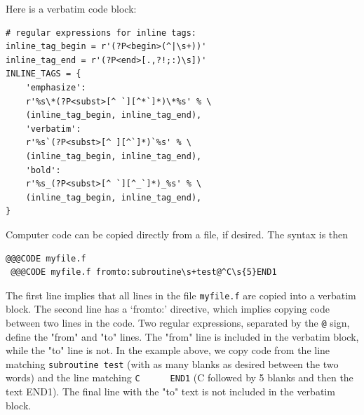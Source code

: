 \documentclass{article}
\begin{document}
Here is a verbatim code block:
\providecommand{\shadedskip}{}
\renewenvironment{shadedskip}{
\def\FrameCommand{\colorbox{shadecolor}}\FrameRule0.6pt
\MakeFramed {\FrameRestore}\vskip3mm}{\vskip0mm\endMakeFramed}
\providecommand{\shadedquoteBlue}{}
\renewenvironment{shadedquoteBlue}[1][]{
\bgroup\rmfamily
\fboxsep=0mm\relax
\begin{shadedskip}
\list{}{\parsep=-2mm\parskip=0mm\topsep=0pt\leftmargin=2mm
\rightmargin=2\leftmargin\leftmargin=4pt\relax}
\item\relax}
{\endlist\end{shadedskip}\egroup}\begin{shadedquoteBlue}
\fontsize{9pt}{9pt}
\begin{Verbatim}
# regular expressions for inline tags:
inline_tag_begin = r'(?P<begin>(^|\s+))'
inline_tag_end = r'(?P<end>[.,?!;:)\s])'
INLINE_TAGS = {
    'emphasize':
    r'%s\*(?P<subst>[^ `][^*`]*)\*%s' % \
    (inline_tag_begin, inline_tag_end),
    'verbatim':
    r'%s`(?P<subst>[^ ][^`]*)`%s' % \
    (inline_tag_begin, inline_tag_end),
    'bold':
    r'%s_(?P<subst>[^ `][^_`]*)_%s' % \
    (inline_tag_begin, inline_tag_end),
}
\end{Verbatim}
\end{shadedquoteBlue}
\noindent

Computer code can be copied directly from a file, if desired. The syntax
is then
\begin{Verbatim}[fontsize=\fontsize{9pt}{9pt},tabsize=8,baselinestretch=0.85,
fontfamily=tt,xleftmargin=7mm]
 @@@CODE myfile.f
 @@@CODE myfile.f fromto:subroutine\s+test@^C\s{5}END1
\end{Verbatim}
\noindent
The first line implies that all lines in the file {\fontsize{10pt}{10pt}\verb!myfile.f!} are copied
into a verbatim block. The second line has a `fromto:' directive, which
implies copying code between two lines in the code. Two regular
expressions, separated by the {\fontsize{10pt}{10pt}\verb!@!} sign, define the "from" and "to" lines.
The "from" line is included in the verbatim block, while the "to" line
is not. In the example above, we copy code from the line matching
{\fontsize{10pt}{10pt}\verb!subroutine test!} (with as many blanks as desired between the two words)
and the line matching {\fontsize{10pt}{10pt}\verb!C      END1!} (C followed by 5 blanks and then
the text END1). The final line with the "to" text is not
included in the verbatim block. 
\end{document}
